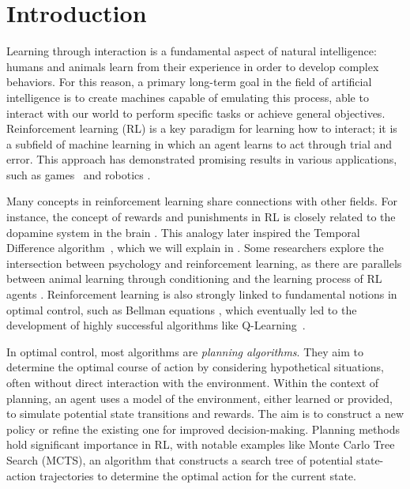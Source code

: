 \chapter{Introduction}
Learning through interaction is a fundamental aspect of natural intelligence: humans and animals learn from their experience in order to develop complex behaviors. For this reason, a primary long-term goal in the field of artificial intelligence is to create machines capable of emulating this process, able to interact with our world to perform specific tasks or achieve general objectives. Reinforcement learning (RL) is a key paradigm for learning how to interact; it is a subfield of machine learning in which an agent learns to act through trial and error. This approach has demonstrated promising results in various applications, such as games~\citep{tesauro1994td, mnih2013playing, silver2016mastering} and robotics \citep{levine2018learning}.

Many concepts in reinforcement learning share connections with other fields. For instance, the concept of rewards and punishments in RL is closely related to the dopamine system in the brain \citep{schultz1997neural}. This analogy later inspired the Temporal Difference algorithm~\citep{sutton1988learning}, which we will explain in . Some researchers explore the intersection between psychology and reinforcement learning, as there are parallels between animal learning through conditioning and the learning process of RL agents \citep{sutton1981toward}. Reinforcement learning is also strongly linked to fundamental notions in optimal control, such as Bellman equations \citep{bellman1954theory, bellman1959adaptive}, which eventually led to the development of highly successful algorithms like Q-Learning~\citep{watkins1992q}.

In optimal control, most algorithms are \emph{planning algorithms}. They aim to determine the optimal course of action by considering hypothetical situations, often without direct interaction with the environment.
Within the context of planning, an agent uses a model of the environment, either learned or provided, to simulate potential state transitions and rewards. The aim is to construct a new policy or refine the existing one for improved decision-making.
Planning methods hold significant importance in RL, with notable examples like Monte Carlo Tree Search (MCTS), an algorithm that constructs a search tree of potential state-action trajectories to determine the optimal action for the current state.

